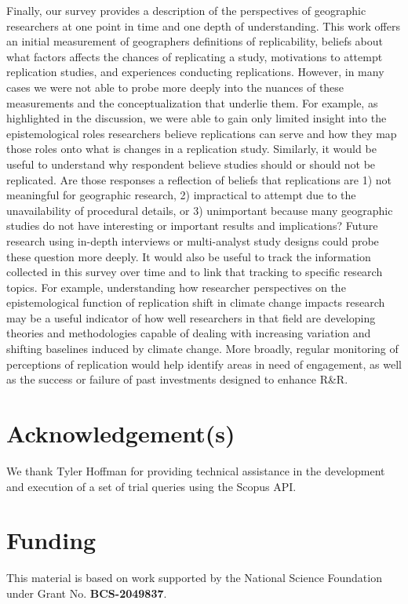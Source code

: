 \documentclass[]{interact}
\theoremstyle{plain}%
\theoremstyle{definition}
\theoremstyle{remark}
\begin{document}
Finally, our survey provides a description of the perspectives of geographic researchers at one point in time and one depth of understanding.
This work offers an initial measurement of geographers definitions of replicability, beliefs about what factors affects the chances of replicating a study, motivations to attempt replication studies, and experiences conducting replications. 
However, in many cases we were not able to probe more deeply into the nuances of these measurements and the conceptualization that underlie them.
For example, as highlighted in the discussion, we were able to gain only limited insight into the epistemological roles researchers believe replications can serve and how they map those roles onto what is changes in a replication study.
Similarly, it would be useful to understand why respondent believe studies should or should not be replicated. 
Are those responses a reflection of beliefs that replications are 1) not meaningful for geographic research, 2) impractical to attempt due to the unavailability of procedural details, or 3) unimportant because many geographic studies do not have interesting or important results and implications?
Future research using in-depth interviews or multi-analyst study designs could probe these question more deeply. 
It would also be useful to track the information collected in this survey over time and to link that tracking to specific research topics. 
For example, understanding how researcher perspectives on the epistemological function of replication shift in climate change impacts research may be a useful indicator of how well researchers in that field are developing theories and methodologies capable of dealing with increasing variation and shifting baselines induced by climate change.
More broadly, regular monitoring of perceptions of replication would help identify areas in need of engagement, as well as the success or failure of past investments designed to enhance R\&R. 


\theendnotes


\section*{Acknowledgement(s)}
We thank Tyler Hoffman for providing technical assistance in the development and execution of a set of trial queries using the Scopus API.

\section*{Funding}
This material is based on work supported by the National Science Foundation under Grant No. \textbf{BCS-2049837}.
\end{document}
